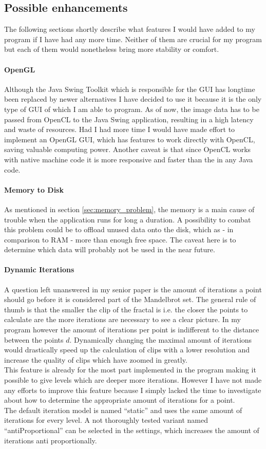 \documentclass[10pt,a4paper,titlepage]{article}
\begin{document}
	\subsection{Possible enhancements}\label{sec:poss_enh}
	The following sections shortly describe what features I would have added to my program if I have had any more time. Neither of them are crucial for my program but each of them would nonetheless bring more stability or comfort.
	\paragraph{OpenGL}
	Although the Java Swing Toolkit which is responsible for the GUI has longtime been replaced by newer alternatives I have decided to use it because it is the only type of GUI of which I am able to program. As of now, the image data has to be passed from OpenCL to the Java Swing application, resulting in a high latency and waste of resources. Had I had more time I would have made effort to implement an OpenGL GUI, which has features to work directly with OpenCL, saving valuable computing power. Another caveat is that since OpenCL works with native machine code it is more responsive and faster than the in any Java code.
	\paragraph{Memory to Disk}
	As mentioned in section \ref{sec:memory_problem}, the memory is a main cause of trouble when the application runs for long a duration. A possibility to combat this problem could be to offload unused data onto the disk, which as - in comparison to RAM - more than enough free space. The caveat here is to determine which data will probably not be used in the near future.
	\paragraph{Dynamic Iterations}
	A question left unanswered in my senior paper is the amount of iterations a point should go before it is considered part of the Mandelbrot set. The general rule of thumb is that the smaller the clip of the fractal is i.e. the closer the points to calculate are the more iterations are necessary to see a clear picture. In my program however the amount of iterations per point is indifferent to the distance between the points \(d\). Dynamically changing the maximal amount of iterations would drastically speed up the calculation of clips with a lower resolution and increase the quality of clips which have zoomed in greatly.\\
	This feature is already for the most part implemented in the program making it possible to give levels which are deeper more iterations. However I have not made any efforts to improve this feature because I simply lacked the time to investigate about how to determine the appropriate amount of iterations for a point.\\
	The default iteration model is named ``static'' and uses the same amount of iterations for every level. A not thoroughly tested variant named ``antiProportional'' can be selected in the settings, which increases the amount of iterations anti proportionally.
\end{document}
